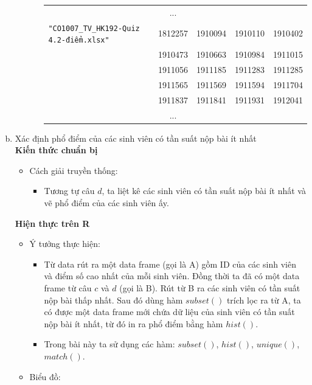\documentclass[a4paper]{article}
\theoremstyle{definition}
\begin{document}
\begin{enumerate}[a)]
\begin{itemize}
\begin{itemize}
\begin{center}
\begin{tabular}{l c c c c}
                     & ...\\
                     \texttt{"CO1007\_TV\_HK192-Quiz 4.2-điểm.xlsx"} & 1812257 & 1910094 & 1910110 & 1910402 \\ & 1910473 & 1910663 & 1910984 & 1911015 \\ & 1911056 & 1911185 & 1911283 & 1911285 \\ & 1911565 & 1911569 & 1911594 & 1911704 \\ & 1911837 & 1911841 & 1911931 & 1912041\\
                     & ...
                \end{tabular}
            \end{center}
        \end{itemize}
    \end{itemize}
    \bf\item {Xác định phổ điểm của các sinh viên có tần suất nộp bài ít nhất}\\[6pt]
    \bf Kiến thức chuẩn bị\normalfont
    \begin{itemize}
        \item Cách giải truyền thống:
        \begin{itemize}
            \item Tương tự câu $d$, ta liệt kê các sinh viên có tần suất nộp bài ít nhất và vẽ phổ điểm của các sinh viên ấy.
        \end{itemize}
    \end{itemize}
    \bf Hiện thực trên R\normalfont
    \begin{itemize}
        \item Ý tưởng thực hiện:
        \begin{itemize}
            \item Từ data rút ra một data frame (gọi là A) gồm ID của các sinh viên và điểm số cao nhất của mỗi sinh viên. Đồng thời ta đã có một data frame từ câu $c$ và $d$ (gọi là B). Rút từ B ra các sinh viên có tần suất nộp bài thấp nhất. Sau đó dùng hàm $subset()$ trích lọc ra từ A, ta có được một data frame mới chứa dữ liệu của sinh viên có tần suất nộp bài ít nhất, từ đó in ra phổ điểm bằng hàm $hist()$.
            \item Trong bài này ta sử dụng các hàm: $subset()$, $hist()$, $unique()$, $match()$.
        \end{itemize}
        \item Biểu đồ:\\
        \begin{center}
        \begin{tabular}{c c}

\end{tabular}
\end{center}
\end{itemize}
\end{enumerate}
\end{document}
